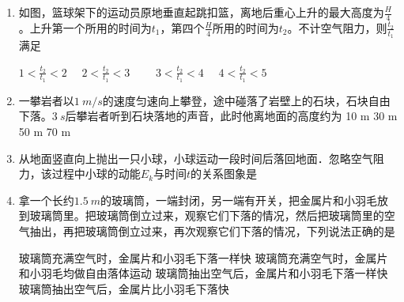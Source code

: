 
\begin{enumerate}[leftmargin=0em]
\renewcommand{\labelenumi}{\arabic{enumi}.}
\item
{}
如图，篮球架下的运动员原地垂直起跳扣篮，离地后重心上升的最大高度为$ \frac{H}{4} $。上升第一个所用的时间为$ t_1 $，第四个$ \frac{H}{4} $所用的时间为$ t_2 $。不计空气阻力，则$\frac { t _ { 2 } } { t _ { 1 } }$满足  
\begin{figure}[h!]
\centering

\end{figure}



\fourchoices
{$1 < \frac { t _ { 2 } } { t _ { 1 } } < 2 \quad$}
{$2 < \frac { t _ { 2 } } { t _ { 1 } } < 3 \quad$}
{$\quad 3 < \frac { t _ { 2 } } { t _ { 1 } } < 4 \quad$}
{$4 < \frac { t _ { 2 } } { t _ { 1 } } < 5$}




\item
{}
一攀岩者以$ 1\ m/s $的速度匀速向上攀登，途中碰落了岩壁上的石块，石块自由下落。$ 3 \ s $后攀岩者听到石块落地的声音，此时他离地面的高度约为  
\fourchoices
{10 m}
{30 m}
{50 m}
{70 m}





\item
{}
从地面竖直向上抛出一只小球，小球运动一段时间后落回地面．忽略空气阻力，该过程中小球的动能$ E_k $与时间$ t $的关系图象是  
\begin{figure}[h!]
\centering

\end{figure}

\item 
{}
拿一个长约$ 1.5\ m $的玻璃筒，一端封闭，另一端有开关，把金属片和小羽毛放到玻璃筒里。把玻璃筒倒立过来，观察它们下落的情况，然后把玻璃筒里的空气抽出，再把玻璃筒倒立过来，再次观察它们下落的情况，下列说法正确的是  


\begin{minipage}[h!]{0.7\linewidth}
\vspace{0.3em}
\fourchoices
{玻璃筒充满空气时，金属片和小羽毛下落一样快}
{玻璃筒充满空气时，金属片和小羽毛均做自由落体运动}
{玻璃筒抽出空气后，金属片和小羽毛下落一样快}
{玻璃筒抽出空气后，金属片比小羽毛下落快}



\end{minipage}
\end{enumerate}
